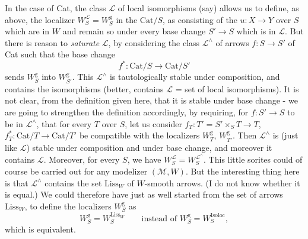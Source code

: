 \documentclass[11pt]{article}
\newcommand{\printedpage}[1]{\marginpar{\footnotesize p.~#1}}
\newcommand{\msp}[1]{\marginpar{\footnotesize [#1]}}
\begin{document}
In the case of Cat, the class $\mathcal{L}$ of local isomorphisms (say) allows us to define, as above, the localizer $W^{\mathcal{L}}_S = W^{\mathrm{g}}_S$ in the $\mathrm{Cat}/S$, as consisting of the $u : X \longrightarrow Y$ over $S$ which are in $W$ and remain so under every base change $S' \longrightarrow S$ which is in $\mathcal{L}$. But there is reason to \textit{saturate} $\mathcal{L}$, by considering the class $\mathcal{L}^\wedge$ of arrows $f : S \longrightarrow S'$ of Cat such that the base change
\[
f^* : \mathrm{Cat}/S \longrightarrow \mathrm{Cat}/S'
\]
sends $W^{\mathrm{g}}_S$ into $W^{\mathrm{g}}_{S'}$. This $\mathcal{L}^\wedge$ is tautologically stable under composition, and contains the isomorphisms (better, contains $\mathcal{L}$ = set of local isomorphisms). It is not
\printedpage{142}
clear, from the definition given here, that it is stable under base change - we are going to strengthen the definition accordingly, by requiring, for $f : S' \longrightarrow S$ to be in $\mathcal{L}^\wedge$, that for every $T$ over $S$, let us consider $f_T : T' = S' \times_S T \longrightarrow T$, $f^*_T : \mathrm{Cat}/T \longrightarrow \mathrm{Cat}/T'$ be compatible with the localizers $W^{\mathrm{g}}_T$, $W^{\mathrm{g}}_{T'}$. Then $\mathcal{L}^\wedge$ is (just like $\mathcal{L}$) stable under composition and under base change, and moreover it contains $\mathcal{L}$. Moreover, for every $S$, we have $W^{\mathcal{L}}_S = W^{\mathcal{L}^\wedge}_S$. This little sorites could of course be carried out for any modelizer $(\mathcal{M},W)$. But the interesting thing here is that $\mathcal{L}^\wedge$ contains the set $\mathrm{Liss}_W$ of $W$-smooth arrows. (I do not know whether it is equal.) We could therefore have
\msp{page 223}
just as well started from the set of arrows $\mathrm{Liss}_W$, to define the localizers $W^{\mathrm{g}}_S$ as
\[
W^{\mathrm{g}}_S = W^{\mathrm{Liss}_W}_S \qquad \text{instead of } W^{\mathrm{g}}_S = W^{\mathrm{Isoloc}}_S,
\]
which is equivalent.
\end{document}
